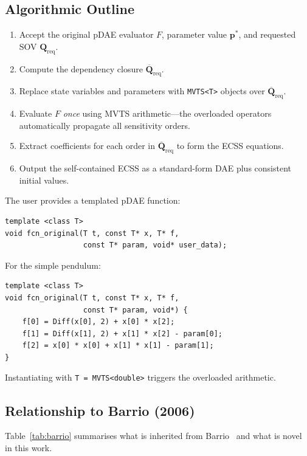\documentclass[12pt,a4paper]{article}
\theoremstyle{definition}
\theoremstyle{plain}
\theoremstyle{remark}
\newcommand{\vp}{\mathbf{p}}
\newcommand{\vQ}{\mathbf{Q}}
\begin{document}
\subsection{Algorithmic Outline}

\begin{enumerate}[nosep]
  \item Accept the original pDAE evaluator $F$, parameter value $\vp^*$, and requested SOV $\vQ_{\text{req}}$.
  \item Compute the dependency closure $\overline{\vQ}_{\text{req}}$.
  \item Replace state variables and parameters with \texttt{MVTS<T>} objects over $\overline{\vQ}_{\text{req}}$.
  \item Evaluate $F$ \emph{once} using MVTS arithmetic---the overloaded operators automatically propagate all sensitivity orders.
  \item Extract coefficients for each order in $\overline{\vQ}_{\text{req}}$ to form the ECSS equations.
  \item Output the self-contained ECSS as a standard-form DAE plus consistent initial values.
\end{enumerate}

The user provides a templated pDAE function:
\begin{lstlisting}
template <class T>
void fcn_original(T t, const T* x, T* f,
                  const T* param, void* user_data);
\end{lstlisting}
For the simple pendulum:
\begin{lstlisting}
template <class T>
void fcn_original(T t, const T* x, T* f,
                  const T* param, void*) {
    f[0] = Diff(x[0], 2) + x[0] * x[2];
    f[1] = Diff(x[1], 2) + x[1] * x[2] - param[0];
    f[2] = x[0] * x[0] + x[1] * x[1] - param[1];
}
\end{lstlisting}
Instantiating with \texttt{T = MVTS<double>} triggers the overloaded arithmetic.

\subsection{Relationship to Barrio (2006)}

Table~\ref{tab:barrio} summarises what is inherited from Barrio~\cite{barrio2006sensitivity} and what is novel in this work.
\end{document}
